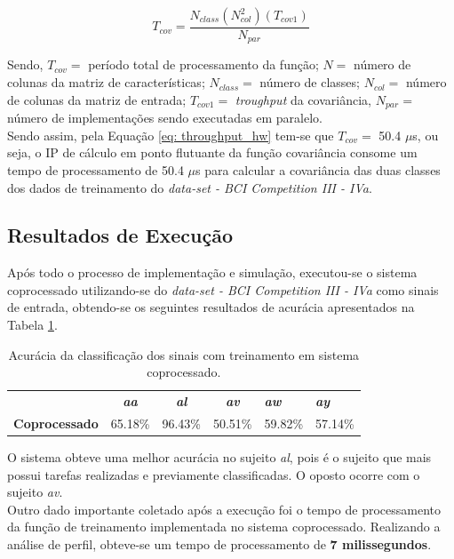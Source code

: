\begin{equation}
\label{eq: throughput_hw}
T_{cov} = \frac{N_{class}(N_{col}^2)(T_{cov1})}{N_{par}} 
\end{equation}

Sendo, $T_{cov} =$ período total de processamento da função; $N =$ número de colunas da matriz de características; $N_{class} =$ número de classes; $N_{col} =$ número de colunas da matriz de entrada; $T_{cov1} =$ \textit{troughput} da covariância, $N_{par} =$ número de implementações sendo executadas em paralelo.\\
Sendo assim, pela Equação \ref{eq: throughput_hw} tem-se que $T_{cov} =$ 50.4 $\mu$s, ou seja, o IP de cálculo em ponto flutuante da função covariância consome um tempo de processamento de 50.4 $\mu$s para calcular a covariância das duas classes dos dados de treinamento do \textit{data-set - BCI Competition III - IVa}.
\subsection{Resultados de Execução}
Após todo o processo de implementação e simulação, executou-se o sistema coprocessado utilizando-se do \textit{data-set - BCI Competition III - IVa}
como sinais de entrada, obtendo-se os seguintes resultados de acurácia apresentados na Tabela \ref{resacc}.


\begin{table}[!h]
	\centering
	\caption{Acurácia da classificação dos sinais com treinamento em sistema coprocessado.}
	\label{resacc}
	
	\begin{tabular}{lcccll}
		\rowcolor[HTML]{DAE8FC} 
		\multicolumn{1}{c}{\cellcolor[HTML]{DAE8FC}\textbf{Sistema}} & \textit{\textbf{aa}}        & \textit{\textbf{al}}        & \textit{\textbf{av}}        & \textit{\textbf{aw}} & \textit{\textbf{ay}} \\
		\textbf{Coprocessado}                                        & \multicolumn{1}{r}{65.18\%} & \multicolumn{1}{r}{96.43\%} & \multicolumn{1}{r}{50.51\%} & 59.82\%              & 57.14\%             
	\end{tabular}
\end{table}
O sistema obteve uma melhor acurácia no sujeito \textit{al}, pois é o sujeito que mais possui tarefas realizadas e previamente classificadas. O oposto ocorre com o sujeito \textit{av}.\\
Outro dado importante coletado após a execução foi o tempo de processamento da função de treinamento implementada no sistema coprocessado. Realizando a análise de perfil, obteve-se um tempo de processamento de \textbf{7 milissegundos}.

